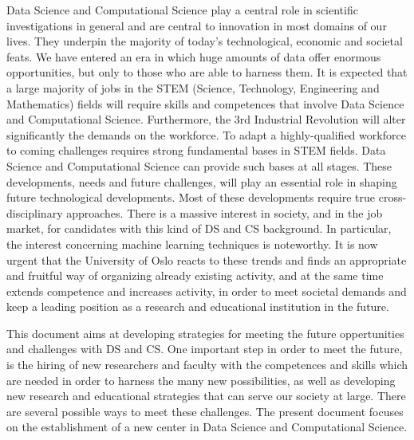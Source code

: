 \documentclass[a4paper,10pt]{article}
\begin{document}
Data Science and Computational Science play a central role in scientific investigations in general and are central to innovation in most domains of our lives. They underpin the majority of today's technological, economic and societal feats. We have entered an era in which huge amounts of data offer enormous opportunities, but only to those who are able to harness them. It is  expected that a large majority  of jobs in the STEM (Science, Technology, Engineering and Mathematics) fields will require skills and competences that involve  Data Science and Computational Science.
Furthermore, the 3rd Industrial Revolution will alter significantly the demands on the workforce. To adapt a highly-qualified workforce to coming challenges requires strong fundamental bases in STEM fields. Data Science and Computational Science can provide such bases at all stages. 
These developments, needs and future challenges, will play an essential role in shaping future technological developments. Most of these developments require true cross-disciplinary approaches.
There is a massive interest in society, and in the job market,  for candidates with this kind of DS and CS background. In particular, the interest concerning machine learning techniques is noteworthy. 
It is now urgent that the University of Oslo reacts to these trends and finds an appropriate and fruitful way of organizing already existing activity, and at the same time extends competence and increases activity, in order to meet societal demands and keep a leading position as a research and educational institution in the future.

This document aims at developing strategies for meeting the future oppertunities and challenges with DS and CS. One important step in order to meet the future, is the hiring of new researchers and faculty with the competences and skills which are needed in order to harness the many new possibilities, as well as developing new research and educational strategies that can serve our society at large. There are several possible ways to meet these challenges. The present document focuses on the establishment of a new center in Data Science and Computational Science.





\end{document}
